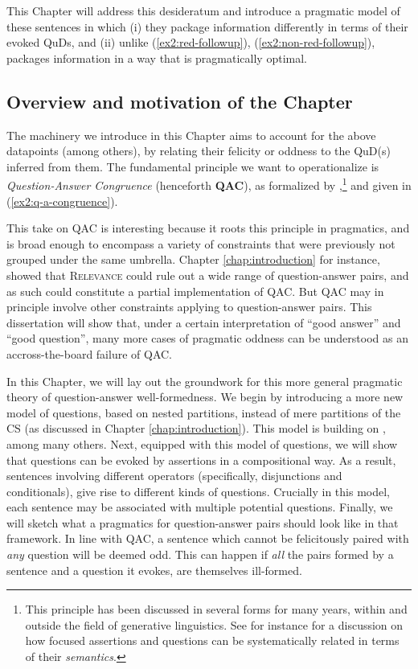 This Chapter will address this desideratum and introduce a pragmatic model of these sentences in which (i) they package information differently in terms of their evoked QuDs, and (ii) unlike (\ref{ex2:red-followup}), (\ref{ex2:non-red-followup}), packages information in a way that is pragmatically optimal.

\subsection{Overview  and motivation of the Chapter}
The machinery we introduce in this Chapter aims to account for the above datapoints (among others), by relating their felicity or oddness to the QuD(s) inferred from them. The fundamental principle we want to operationalize is \textit{Question-Answer Congruence} (henceforth \textbf{QAC}), as formalized by \citet{Katzir2015},\footnote{This principle has been discussed in several forms for many years, within and outside the field of generative linguistics. See for instance \citet{Rooth1992} for a discussion on how focused assertions and questions can be systematically related in terms of their \textit{semantics}.} and given in (\ref{ex2:q-a-congruence}). 

\begin{exe}
	\label{ex2:q-a-congruence}
\end{exe}

This take on QAC is interesting because it roots this principle in pragmatics, and is broad enough to encompass a variety of constraints that were previously not grouped under the same umbrella. Chapter \ref{chap:introduction} for instance, showed that \textsc{Relevance} could rule out a wide range of question-answer pairs, and as such could constitute a partial implementation of QAC. But QAC may in principle involve other constraints applying to question-answer pairs. This dissertation will show that, under a certain interpretation of ``good answer'' and ``good question'', many more cases of pragmatic oddness can be understood as an accross-the-board failure of QAC.

In this Chapter, we will lay out the groundwork for this more general pragmatic theory of question-answer well-formedness. We begin by introducing a more new model of questions, based on nested partitions, instead of mere partitions of the CS (as discussed in Chapter \ref{chap:introduction}). This model is building on \citet{Buring2003,Ippolito2019,Zhang2022}, among many others. Next, equipped with this model of questions, we will show that questions can be evoked by assertions in a compositional way. As a result, sentences involving different operators (specifically, disjunctions and conditionals), give rise to different kinds of questions. Crucially in this model, each sentence may be associated with multiple potential questions. Finally, we will sketch what a pragmatics for question-answer pairs should look like in that framework. In line with QAC, a sentence which cannot be felicitously paired with \textit{any} question will be deemed odd. This can happen if \textit{all} the pairs formed by a sentence and a question it evokes, are themselves ill-formed. 

